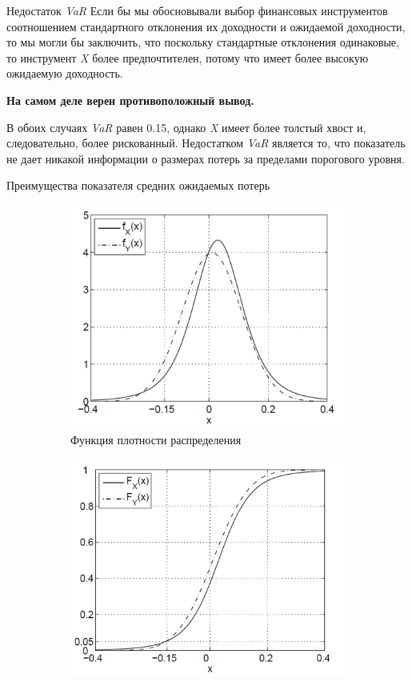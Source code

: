 \documentclass[financial_risks_lectures.tex]{subfiles}
\begin{document}
\begin{frame}{Недостаток \textit{VaR }}
Если бы мы обосновывали выбор финансовых инструментов соотношением стандартного отклонения их доходности и ожидаемой доходности, то мы могли бы заключить, что поскольку стандартные отклонения одинаковые, то инструмент \textit{X} более предпочтителен, потому что имеет более высокую ожидаемую доходность. 

\textbf{На самом деле верен противоположный вывод.}

В обоих случаях \textit{VaR }равен 0.15, однако \textit{X }имеет более толстый хвост и, следовательно, более рискованный. Недостатком \textit{VaR }является то, что показатель не дает никакой информации о размерах потерь за пределами порогового уровня.

\end{frame}
\begin{frame}[allowframebreaks]{Преимущества показателя средних ожидаемых потерь}
\begin{figure}	
	\centering
	\begin{subfigure}[t]{4.1cm}
		\centering
		\includegraphics[scale=0.3]{img/expected_shortfall_df.png}
	\caption{Функция плотности распределения}\label{fig:a_df}	
	\end{subfigure}
	\quad
	\begin{subfigure}[t]{4.1cm}
		\centering
		\includegraphics[scale=0.3]{img/expected_shortfall_cdfs.png}

\end{subfigure}
\end{figure}
\end{frame}
\end{document}
